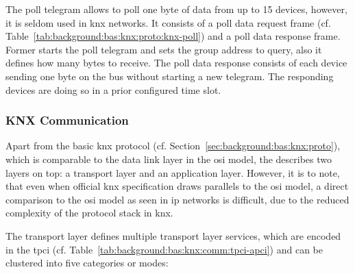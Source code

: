 The poll telegram allows to poll one byte of data from up to 15 devices, however, it is seldom used in \gls{knx} networks. It consists of a poll data request frame (cf. Table~\ref{tab:background:bas:knx:proto:knx-poll}) and a poll data response frame. Former starts the poll telegram and sets the group address to query, also it defines how many bytes to receive.
The poll data response consists of each device sending one byte on the bus without starting a new telegram. The responding devices are doing so in a prior configured time slot. \parencite{Hubner2009,DIN_EN_50090-5-2}

\subsubsection{KNX Communication}
\label{sec:background:bas:knx:communication}

Apart from the basic \gls{knx} protocol (cf. Section~\ref{sec:background:bas:knx:proto}), which is comparable to the data link layer in the \gls{osi} model, the \textcite{DIN_EN_50090-4-1} describes two layers on top: a transport layer and an application layer.
However, it is to note, that even when official \gls{knx} specification draws parallels to the \gls{osi} model, a direct comparison to the \gls{osi} model as seen in \gls{ip} networks is difficult, due to the reduced complexity of the protocol stack in \gls{knx}.

The transport layer defines multiple transport layer services, which are encoded in the \gls{tpci} (cf. Table~\ref{tab:background:bas:knx:comm:tpci-apci}) and can be clustered into five categories or modes:

